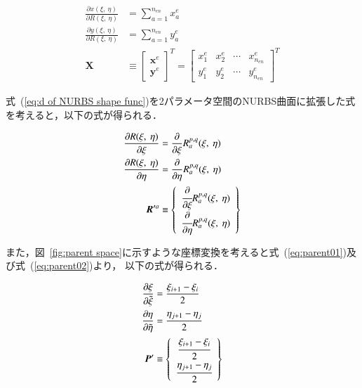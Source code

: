 \begin{align}
  \frac{\partial x(\xi,\ \eta)}{\partial R(\xi,\ \eta)} &= \sum^{n_{en}}_{a = 1} x^e_a\\
  \frac{\partial y(\xi,\ \eta)}{\partial R(\xi,\ \eta)} &= \sum^{n_{en}}_{a = 1} y^e_a\\
  \boldsymbol{X} &\equiv \left[
    \begin{array}{c}
      \boldsymbol{x}^e\\
      \boldsymbol{y}^e
    \end{array}
  \right]^T = \left[
    \begin{array}{cccc}
      x^e_1 & x^e_2 & \cdots & x^e_{n_{en}}\\
      y^e_1 & y^e_2 & \cdots & y^e_{n_{en}}
    \end{array}
  \right]^T
\end{align}

\newpage

\noindent
式~(\ref{eq:d of NURBS shape func})を2パラメータ空間のNURBS曲面に拡張した式を考えると，以下の式が得られる．

\begin{align}
  \frac{\partial R(\xi,\ \eta)}{\partial \xi}  &= \frac{\partial}{\partial \xi}R^{p,q}_a(\xi,\ \eta)\\
  \frac{\partial R(\xi,\ \eta)}{\partial \eta} &= \frac{\partial}{\partial \eta}R^{p,q}_a(\xi,\ \eta)\\
  \boldsymbol{R}'^{a} &\equiv \left\{
    \begin{array}{c}
      \cfrac{\partial}{\partial \xi}R^{p,q}_a(\xi,\ \eta)\\
      \cfrac{\partial}{\partial \eta}R^{p,q}_a(\xi,\ \eta)
    \end{array}
  \right\}
\end{align}

\noindent
また，図~\ref{fig:parent space}に示すような座標変換を考えると式~(\ref{eq:parent01})及び式~(\ref{eq:parent02})より，
以下の式が得られる．

\begin{align}
  \frac{\partial \xi}{\partial \tilde{\xi}} &= \frac{\xi_{i+1} - \xi_i}{2}\\
  \frac{\partial \eta}{\partial \tilde{\eta}} &= \frac{\eta_{j+1} - \eta_j}{2}\\
  \boldsymbol{P}' &\equiv \left\{
    \begin{array}{c}
      \cfrac{\xi_{i+1} - \xi_i}{2}\\
      \cfrac{\eta_{j+1} - \eta_j}{2}
    \end{array}
  \right\}
\end{align}

